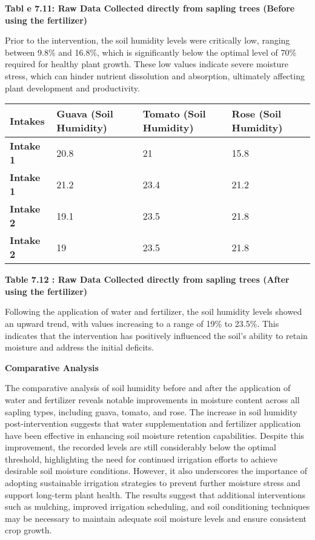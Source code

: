 \documentclass{book} %
\begin{document}
\textbf{}

\noindent \textbf{Tabl e 7.11: Raw Data Collected directly from sapling trees (Before using the fertilizer)}

\noindent Prior to the intervention, the soil humidity levels were critically low, ranging between 9.8\% and 16.8\%, which is significantly below the optimal level of 70\% required for healthy plant growth. These low values indicate severe moisture stress, which can hinder nutrient dissolution and absorption, ultimately affecting plant development and productivity.

\begin{tabular}{|p{0.7in}|p{0.7in}|p{0.8in}|p{0.8in}|} \hline 
\textbf{Intakes} & \textbf{Guava (Soil Humidity)} & \textbf{Tomato (Soil Humidity)} & \textbf{Rose (Soil Humidity)} \\ \hline 
\textbf{Intake 1} & 20.8 & 21 & 15.8 \\ \hline 
\textbf{Intake 1} & 21.2 & 23.4 & 21.2 \\ \hline 
\textbf{Intake 2} & 19.1 & 23.5 & 21.8 \\ \hline 
\textbf{Intake 2} & 19 & 23.5 & 21.8 \\ \hline 
\end{tabular}

\textbf{Table 7.12 : Raw Data Collected directly from sapling trees (After using the fertilizer) }

\noindent Following the application of water and fertilizer, the soil humidity levels showed an upward trend, with values increasing to a range of 19\% to 23.5\%. This indicates that the intervention has positively influenced the soil's ability to retain moisture and address the initial deficits.

\noindent \textbf{Comparative Analysis}

\noindent The comparative analysis of soil humidity before and after the application of water and fertilizer reveals notable improvements in moisture content across all sapling types, including guava, tomato, and rose. The increase in soil humidity post-intervention suggests that water supplementation and fertilizer application have been effective in enhancing soil moisture retention capabilities. Despite this improvement, the recorded levels are still considerably below the optimal threshold, highlighting the need for continued irrigation efforts to achieve desirable soil moisture conditions. However, it also underscores the importance of adopting sustainable irrigation strategies to prevent further moisture stress and support long-term plant health. The results suggest that additional interventions such as mulching, improved irrigation scheduling, and soil conditioning techniques may be necessary to maintain adequate soil moisture levels and ensure consistent crop growth.
\end{document}
